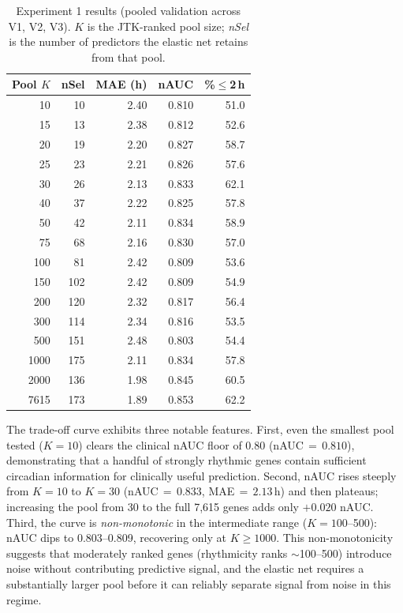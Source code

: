 \documentclass[10pt,a4paper]{article}
\begin{document}
\begin{table}[h]
\centering
\begin{tabular}{rrrrr}
\toprule
Pool $K$ & nSel & MAE (h) & nAUC & \%$\leq$2\,h \\
\midrule
  10  &  10 & 2.40 & 0.810 & 51.0 \\
  15  &  13 & 2.38 & 0.812 & 52.6 \\
  20  &  19 & 2.20 & 0.827 & 58.7 \\
  25  &  23 & 2.21 & 0.826 & 57.6 \\
  30  &  26 & 2.13 & 0.833 & 62.1 \\
  40  &  37 & 2.22 & 0.825 & 57.8 \\
  50  &  42 & 2.11 & 0.834 & 58.9 \\
  75  &  68 & 2.16 & 0.830 & 57.0 \\
 100  &  81 & 2.42 & 0.809 & 53.6 \\
 150  & 102 & 2.42 & 0.809 & 54.9 \\
 200  & 120 & 2.32 & 0.817 & 56.4 \\
 300  & 114 & 2.34 & 0.816 & 53.5 \\
 500  & 151 & 2.48 & 0.803 & 54.4 \\
1000  & 175 & 2.11 & 0.834 & 57.8 \\
2000  & 136 & 1.98 & 0.845 & 60.5 \\
7615  & 173 & 1.89 & 0.853 & 62.2 \\
\bottomrule
\end{tabular}
\caption{Experiment 1 results (pooled validation across V1, V2, V3).
$K$ is the JTK-ranked pool size;
\emph{nSel} is the number of predictors the elastic net
retains from that pool.}
\label{tab:exp1}
\end{table}

The trade-off curve exhibits three notable features.
First, even the smallest pool tested ($K = 10$) clears the
clinical nAUC floor of 0.80 (nAUC\,${=}\,0.810$), demonstrating that
a handful of strongly rhythmic genes contain sufficient circadian
information for clinically useful prediction.
Second, nAUC rises steeply from $K = 10$ to $K = 30$
(nAUC\,${=}\,0.833$, MAE\,${=}\,2.13$\,h) and then plateaus;
increasing the pool from 30 to the full 7,615 genes adds only
$+0.020$ nAUC.
Third, the curve is \emph{non-monotonic} in the intermediate range
($K = 100$--500): nAUC dips to 0.803--0.809, recovering only at
$K \geq 1000$.
This non-monotonicity suggests that moderately ranked genes
(rhythmicity ranks ${\sim}$100--500) introduce noise without
contributing predictive signal, and the elastic net requires a
substantially larger pool before it can reliably separate signal
from noise in this regime.
\end{document}
